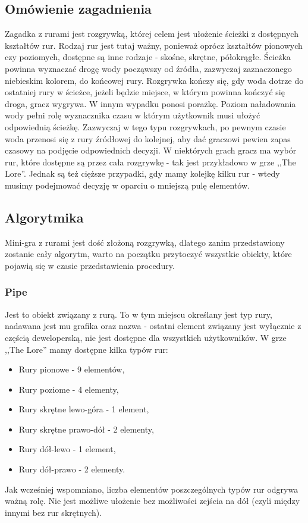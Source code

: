 \documentclass[oneside,polski,logo]{amuthesis}
\begin{document}
\subsection{Omówienie zagadnienia}
\par Zagadka z rurami jest rozgrywką, której celem jest ułożenie ścieżki z dostępnych kształtów rur. Rodzaj rur jest tutaj ważny, ponieważ oprócz kształtów pionowych czy poziomych, dostępne są inne rodzaje - skośne, skrętne, półokrągłe.
Ścieżka powinna wyznaczać drogę wody począwszy od źródła, zazwyczaj zaznaczonego niebieskim kolorem, do końcowej rury. Rozgrywka kończy się, gdy woda dotrze do ostatniej rury w ścieżce, jeżeli będzie miejsce, w którym powinna kończyć się droga, gracz wygrywa. W innym wypadku ponosi porażkę.
Poziom naładowania wody pełni rolę wyznacznika czasu w którym użytkownik musi ułożyć odpowiednią ścieżkę. Zazwyczaj w tego typu rozgrywkach, po pewnym czasie woda przenosi się z rury źródłowej do kolejnej, aby dać graczowi pewien zapas czasowy na podjęcie odpowiednich decyzji. W niektórych grach gracz ma wybór rur, które dostępne są przez cała rozgrywkę - tak jest przykładowo w grze ,,The Lore''. Jednak są też cięższe przypadki, gdy mamy kolejkę kilku rur - wtedy musimy podejmować decyzję w oparciu o mniejszą pulę elementów.
\subsection{Algorytmika}
\par Mini-gra z rurami jest dość złożoną rozgrywką, dlatego zanim przedstawiony zostanie cały algorytm, warto na początku przytoczyć wszystkie obiekty, które pojawią się w czasie przedstawienia procedury.
\subsubsection{Pipe}
\par Jest to obiekt związany z rurą. To w tym miejscu określany jest typ rury, nadawana jest mu grafika oraz nazwa - ostatni element związany jest wyłącznie z częścią deweloperską, nie jest dostępne dla wszystkich użytkowników. W grze ,,The Lore'' mamy dostępne kilka typów rur:
\begin{itemize}
  \item Rury pionowe - 9 elementów,
  \item Rury poziome - 4 elementy,
  \item Rury skrętne lewo-góra - 1 element,
  \item Rury skrętne prawo-dół - 2 elementy,
  \item Rury dół-lewo -  1 element,
  \item Rury dół-prawo - 2 elementy.
\end{itemize}
Jak wcześniej wspomniano, liczba elementów poszczególnych typów rur odgrywa ważną rolę. Nie jest możliwe ułożenie bez możliwości zejścia na dół (czyli między innymi bez rur skrętnych). 
\end{document}
